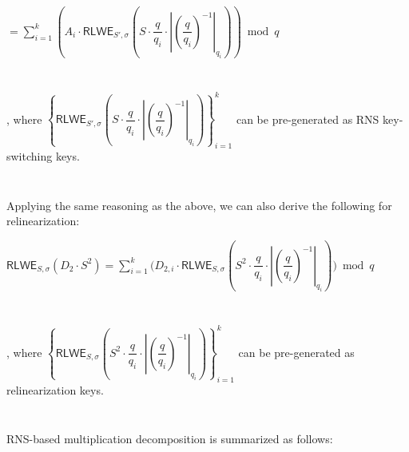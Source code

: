 $= \sum\limits_{i=1}^{k}\left(A_{i}\cdot \textsf{RLWE}_{S', \sigma}\left(S \cdot\dfrac{q}{q_i} \cdot \left| \left(\dfrac{q}{q_i}\right)^{-1}\right|_{q_i}\right)\right) \bmod q$

$ $

$ $

, where $\left\{\textsf{RLWE}_{S', \sigma}\left(S \cdot\dfrac{q}{q_i} \cdot \left| \left(\dfrac{q}{q_i}\right)^{-1}\right|_{q_i}\right)\right\}_{i=1}^{k}$ can be pre-generated as RNS key-switching keys.  

$ $

$ $

Applying the same reasoning as the above, we can also derive the following for relinearization:

$\textsf{RLWE}_{S, \sigma}(D_2 \cdot S^2) = \sum\limits_{i=1}^{k}\Bigg( D_{2, i}\cdot \textsf{RLWE}_{S, \sigma}\left(S^2 \cdot\dfrac{q}{q_i} \cdot \left| \left(\dfrac{q}{q_i}\right)^{-1}\right|_{q_i}\right)\Bigg) \bmod q$

$ $

$ $

, where $\left\{\textsf{RLWE}_{S, \sigma}\left(S^2 \cdot\dfrac{q}{q_i} \cdot \left| \left(\dfrac{q}{q_i}\right)^{-1}\right|_{q_i}\right)\right\}_{i=1}^{k}$ can be pre-generated as relinearization keys.

$ $

$ $

RNS-based multiplication decomposition is summarized as follows:

